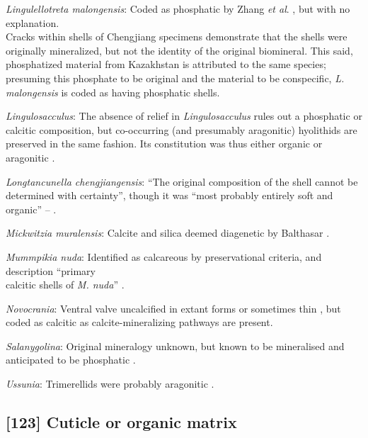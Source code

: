 \documentclass[openany]{book}
\theoremstyle{definition}
\theoremstyle{definition}
\theoremstyle{definition}
\theoremstyle{remark}
\begin{document}
\hypertarget{Lingulellotreta_malongensis-coding-122}{}
\emph{Lingulellotreta malongensis}: Coded as phosphatic by Zhang
\emph{et al}. \citeyearpar{Zhang2014Anearly}, but with no explanation.\\
Cracks within shells of Chengjiang specimens \citep[e.g.][fig.
3]{Zhang2007Noteon} demonstrate that the shells were originally
mineralized, but not the identity of the original biomineral. This said,
phosphatized material from Kazakhstan \citep{Holmer1997EarlyCambrian} is
attributed to the same species; presuming this phosphate to be original
and the material to be conspecific, \emph{L. malongensis} is coded as
having phosphatic shells.

\hypertarget{Lingulosacculus-coding-122}{}
\emph{Lingulosacculus}: The absence of relief in \emph{Lingulosacculus}
rules out a phosphatic or calcitic composition, but co-occurring (and
presumably aragonitic) hyolithids are preserved in the same fashion. Its
constitution was thus either organic or aragonitic
\citep{Balthasar2009EarlyCambrian}.

\hypertarget{Longtancunella_chengjiangensis-coding-122}{}
\emph{Longtancunella chengjiangensis}: ``The original composition of the
shell cannot be determined with certainty'', though it was ``most
probably entirely soft and organic'' --
\citet{Zhang2011Theexceptionally}.

\hypertarget{Mickwitzia_muralensis-coding-122}{}
\emph{Mickwitzia muralensis}: Calcite and silica deemed diagenetic by
Balthasar \citeyearpar{Balthasar2004Shellstructure}.

\hypertarget{Mummpikia_nuda-coding-122}{}
\emph{Mummpikia nuda}: Identified as calcareous by preservational
criteria, and description ``primary\\
calcitic shells of \emph{M. nuda}'' \citep{Balthasar2008iMummpikia}.

\hypertarget{Novocrania-coding-122}{}
\emph{Novocrania}: Ventral valve uncalcified in extant forms or
sometimes thin \citep{Williams2000LinguliformeaCraniiformea}, but coded
as calcitic as calcite-mineralizing pathways are present.

\hypertarget{Salanygolina-coding-122}{}
\emph{Salanygolina}: Original mineralogy unknown, but known to be
mineralised and anticipated to be phosphatic
\citep{Holmer2009Theenigmatic}.

\hypertarget{Ussunia-coding-122}{}
\emph{Ussunia}: Trimerellids were probably aragonitic
\citep{Williams2000LinguliformeaCraniiformea}.

\subsection*{{[}123{]} Cuticle or organic
matrix}\label{cuticle-or-organic-matrix}
\end{document}

